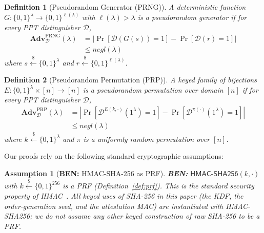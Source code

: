\documentclass{ieeeaccess}
\DeclareRobustCommand{\ben}[1]{{\color{BENcolor}\textbf{BEN:} #1}}
\newtheorem{definition}{Definition}
\newtheorem{assumption}{Assumption}[section]
\newcommand{\Adv}{\mathbf{Adv}}
\begin{document}
\begin{definition}[Pseudorandom Generator (PRNG)]
\label{def:prng}
A deterministic function $G : \{0,1\}^{\lambda} \to \{0,1\}^{\ell(\lambda)}$
with $\ell(\lambda) > \lambda$ is a \emph{pseudorandom generator} if for
every PPT distinguisher $\mathcal{D}$,
\[
\begin{aligned}
  \Adv^{\mathrm{PRNG}}_{\mathcal{D}}(\lambda)
  &=
  \left|
    \Pr\!\left[\mathcal{D}(G(s)) = 1\right]
    -
    \Pr\!\left[\mathcal{D}(r) = 1\right]
  \right| \\
  &\leq \mathit{negl}(\lambda)
\end{aligned}
\]
where $s \xleftarrow{\$} \{0,1\}^{\lambda}$ and
$r \xleftarrow{\$} \{0,1\}^{\ell(\lambda)}$.
\end{definition}
 
\begin{definition}[Pseudorandom Permutation (PRP)]
\label{def:prp}
A keyed family of bijections
$E : \{0,1\}^{\lambda} \times [n] \to [n]$
is a \emph{pseudorandom permutation} over domain $[n]$ if for every
PPT distinguisher $\mathcal{D}$,
\[
\begin{aligned}
  \Adv^{\mathrm{PRP}}_{\mathcal{D}}(\lambda)
  &=
  \left|
    \Pr\!\left[\mathcal{D}^{E(k,\cdot)}(1^{\lambda}) = 1\right]
    -
    \Pr\!\left[\mathcal{D}^{\pi(\cdot)}(1^{\lambda}) = 1\right]
  \right|\\
  &\leq \mathit{negl}(\lambda)
\end{aligned}
\]
where $k \xleftarrow{\$} \{0,1\}^{\lambda}$ and $\pi$ is a uniformly random
permutation over $[n]$.
\end{definition}
 
Our proofs rely on the following standard cryptographic assumptions:
 
\begin{assumption}[\ben{HMAC-SHA-256 as PRF}]
\label{asm:sha256-prf}
\ben{$\mathsf{HMAC\text{-}SHA256}(k,\cdot)$ with $k \xleftarrow{\$} \{0,1\}^{256}$ is a PRF (Definition~\ref{def:prf}).
This is the standard security property of HMAC~\cite{bellare1996new,bellare2006hmac}.
All keyed uses of SHA-256 in this paper (the KDF, the order-generation seed, and the attestation MAC) are instantiated with HMAC-SHA256; we do not assume any other keyed construction of raw SHA-256 to be a PRF.}

\end{assumption}
 
\end{document}
